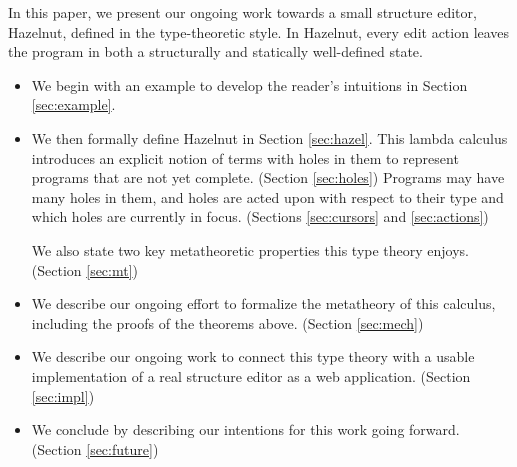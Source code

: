 In this paper, we present our ongoing work towards a small structure editor, Hazelnut,  defined in the type-theoretic style. In Hazelnut, every edit action leaves the program in both a structurally and statically well-defined state.
\begin{itemize}
  \item We begin with an example to develop the reader's intuitions in Section
    \ref{sec:example}.

  \item We then formally define Hazelnut in Section \ref{sec:hazel}. This
    lambda calculus introduces an explicit notion of terms with holes in
    them to represent programs that are not yet complete.
    (Section \ref{sec:holes}) Programs may have many holes in them, and
    holes are acted upon with respect to their type and which holes are
    currently in focus. (Sections \ref{sec:cursors} and \ref{sec:actions})

    We also state two key metatheoretic properties this type theory
    enjoys. (Section \ref{sec:mt})

  \item We describe our ongoing effort to formalize the metatheory of this
    calculus, including the proofs of the theorems
    above. (Section \ref{sec:mech})

  \item We describe our ongoing work to connect this type theory with a
    usable implementation of a real structure editor as a web
    application. (Section \ref{sec:impl})

  \item We conclude by describing our intentions for this work going
    forward. (Section \ref{sec:future})
\end{itemize}
